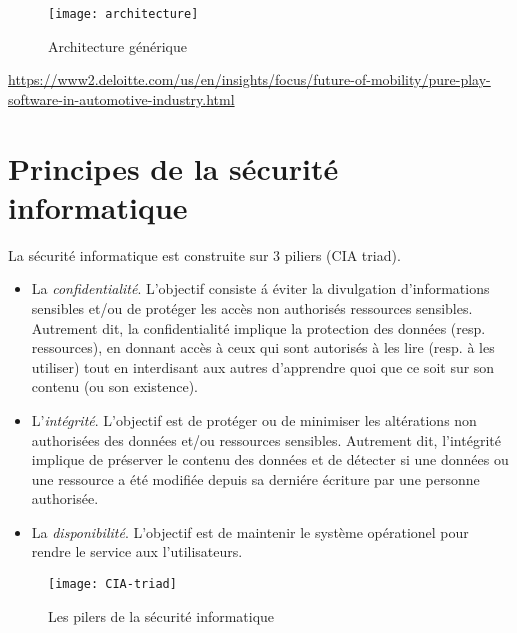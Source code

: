 \begin{figure}
    \texttt{[image: architecture]}
    \caption{Architecture g\'en\'erique}
    \label{fig:archi}
\end{figure}
\url{https://www2.deloitte.com/us/en/insights/focus/future-of-mobility/pure-play-software-in-automotive-industry.html}



\section {Principes de la s\'ecurit\'e informatique}
\medskip
{\Huge L}a s\'ecurit\'e informatique est construite sur 3 piliers (CIA triad).
  
\begin{itemize}
\setlength\itemsep{1em}
\item La \emph{confidentialit\'e}. L'objectif consiste \'a \'eviter la divulgation d'informations sensibles et/ou de prot\'eger les acc\`es non authoris\'es ressources sensibles. Autrement dit, la confidentialit\'e implique la protection des donn\'ees (resp. ressources), en donnant acc\`es \`a ceux qui sont autoris\'es \`a les lire (resp. \`a les utiliser) tout en interdisant aux autres d'apprendre quoi que ce soit sur son contenu (ou son existence).  
\item L'\emph{int\'egrit\'e}. L'objectif est de prot\'eger ou de minimiser les alt\'erations non authoris\'ees des donn\'ees et/ou ressources sensibles. Autrement dit, l'int\'egrit\'e implique de pr\'eserver le contenu des donn\'ees et de d\'etecter si une donn\'ees ou une ressource a \'et\'e modifi\'ee depuis sa derni\'ere \'ecriture par une personne authoris\'ee.  
\item La \emph{disponibilit\'e}. L'objectif est de maintenir le syst\`eme op\'erationel pour rendre le service aux l'utilisateurs.  
\end{itemize}

\FloatBarrier
\begin{figure}[h]
	\centering
    \texttt{[image: CIA-triad]}
    \caption{Les pilers de la s\'ecurit\'e informatique}
    \label{fig:CIA}
\end{figure}
\FloatBarrier



